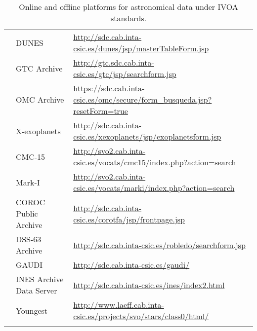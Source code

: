 \begin{center}
\begin{longtable}{|m{2cm}|m{4.5cm}|m{7.5cm}|}
    \cline{2-3}
    & DUNES
    & \url{http://sdc.cab.inta-csic.es/dunes/jsp/masterTableForm.jsp} \\
    \cline{2-3}
    & GTC Archive
    & \url{http://gtc.sdc.cab.inta-csic.es/gtc/jsp/searchform.jsp} \\
    \cline{2-3}
    & OMC Archive
    &
    \url{https://sdc.cab.inta-csic.es/omc/secure/form_busqueda.jsp?resetForm=true}
    \\
    \cline{2-3}
    & X-exoplanets
    & \url{http://sdc.cab.inta-csic.es/xexoplanets/jsp/exoplanetsform.jsp} \\
    \cline{2-3}
    & CMC-15
    & \url{http://svo2.cab.inta-csic.es/vocats/cmc15/index.php?action=search} \\
    \cline{2-3}
    & Mark-I
    & \url{http://svo2.cab.inta-csic.es/vocats/marki/index.php?action=search} \\
    \cline{2-3}
    & COROC Public Archive
    & \url{http://sdc.cab.inta-csic.es/corotfa/jsp/frontpage.jsp} \\
    \cline{2-3}
    & DSS-63 Archive
    & \url{http://sdc.cab.inta-csic.es/robledo/searchform.jsp} \\
    \cline{2-3}
    & GAUDI
    & \url{http://sdc.cab.inta-csic.es/gaudi/} \\
    \cline{2-3}
    & INES Archive Data Server
    & \url{http://sdc.cab.inta-csic.es/ines/index2.html} \\
    \cline{2-3}
    & Youngest
    & \url{http://www.laeff.cab.inta-csic.es/projects/svo/stars/class0/html/} \\
    \hline
\caption{Online and offline platforms for astronomical data under IVOA
         standards.}
\label{table:vo_platforms}
\end{longtable}
\end{center}
